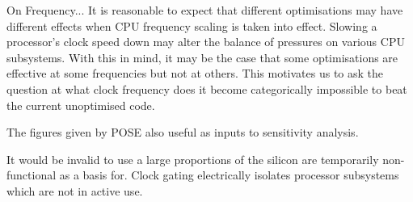 



On Frequency...
It is reasonable to expect that different optimisations may have different effects when CPU frequency scaling is taken into effect. Slowing a processor's clock speed down may alter the balance of pressures on various CPU subsystems. With this in mind, it may be the case that some optimisations are effective at some frequencies but not at others. This motivates us to ask the question at what clock frequency does it become categorically impossible to beat the current unoptimised code.

The figures given by POSE also useful as inputs to sensitivity analysis.






It would be invalid to use a large proportions of the silicon are temporarily non-functional as a basis for. 
Clock gating electrically isolates processor subsystems which are not in active use.


